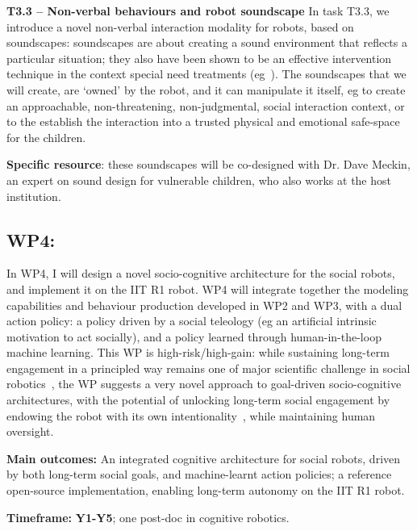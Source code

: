 \documentclass[11pt,a4paper]{report}
\begin{document}
\textbf{T3.3 -- Non-verbal behaviours and robot soundscape} In task T3.3, we
introduce a novel non-verbal interaction modality for robots, based on
soundscapes: soundscapes are about creating a sound environment that reflects a
particular situation; they also have been shown to be an effective intervention
technique in the context special need treatments
(eg~\cite{greher2010soundscape}). The soundscapes that we will create, are
`owned' by the robot, and it can manipulate it itself, eg to create an
approachable, non-threatening, non-judgmental, social interaction context, or to
the establish the interaction into a trusted physical and emotional safe-space
for the children.

\textbf{Specific resource}: these soundscapes will be co-designed with Dr.
Dave Meckin, an expert on sound design for vulnerable children, who also works
at the host institution.

\subsection{WP4: \textbf{\wpFour}}

In WP4, I will design a novel socio-cognitive architecture for the social
robots, and implement it on the IIT R1 robot.  WP4 will integrate together the
modeling capabilities and behaviour production developed in WP2 and WP3, with a
dual action policy: a policy driven by a social teleology (eg an artificial
intrinsic motivation to act socially), and a policy learned through
human-in-the-loop machine learning. This WP is high-risk/high-gain: while sustaining
long-term engagement in a principled way remains one of major scientific
challenge in social robotics~\cite{hoffman2019anki}, the WP suggests a very novel
approach to goal-driven socio-cognitive architectures, with the potential of
unlocking long-term social engagement by endowing the robot with its own
intentionality~\cite{wiese2017robots}, while maintaining human oversight.

\begin{framed}
    \textbf{Main outcomes:} An integrated cognitive architecture for social
    robots, driven by both long-term social goals, and machine-learnt action
    policies; a reference open-source implementation, enabling long-term
    autonomy on the IIT R1 robot.

    \textbf{Timeframe:} \textbf{Y1-Y5}; one post-doc in cognitive robotics.

\end{framed}
\end{document}
